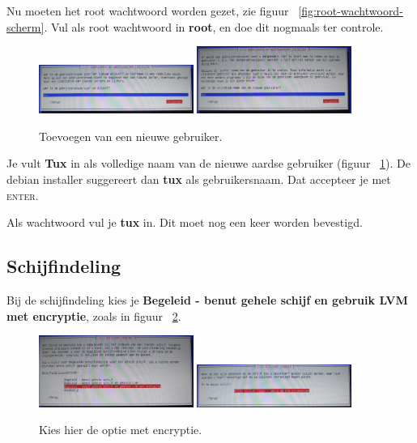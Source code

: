 \documentclass[12pt,a4paper]{article}
\begin{document}
Nu moeten het root wachtwoord worden gezet, zie figuur ~\ref{fig:root-wachtwoord-scherm}.
Vul als root wachtwoord in \textbf{root}, en doe dit nogmaals ter controle.

\begin{figure}[H]
\centering
\includegraphics[width=0.45\textwidth]{nieuwe-gebruiker-naam}
\includegraphics[width=0.45\textwidth]{nieuwe-gebruiker-echte-naam}
\caption{Toevoegen van een nieuwe gebruiker.}
\label{fig:nieuwe-gebruiker}
\end{figure}

Je vult \textbf{Tux} in als volledige naam van de nieuwe aardse gebruiker (figuur ~\ref{fig:nieuwe-gebruiker}).
De debian installer suggereert dan \textbf{tux} als gebruikersnaam.
Dat accepteer je met \textsc{enter}.

Als wachtwoord vul je \textbf{tux} in. Dit moet nog een keer worden bevestigd.


\subsection{Schijfindeling}
Bij de schijfindeling kies je \textbf{Begeleid - benut gehele schijf en gebruik LVM met encryptie}, zoals in figuur ~\ref{fig:schijven-indelen}.

\begin{figure}[H]
\centering
\includegraphics[width=0.45\textwidth]{schijven-indelen-scherm}
\includegraphics[width=0.45\textwidth]{schijf-uitkiezen-scherm}
\caption{Kies hier de optie met encryptie.}
\label{fig:schijven-indelen}
\end{figure}
\end{document}

